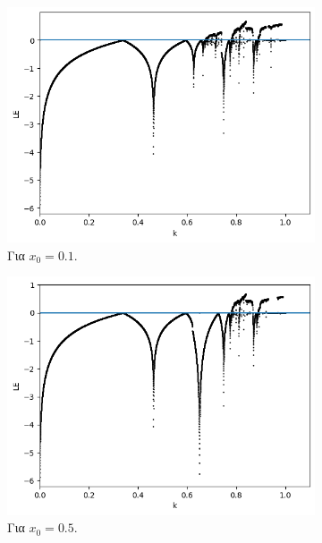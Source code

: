 \begin{figure}[h!]
	\centering
	\begin{subfigure}[b]{0.45\textwidth}
		\centering
		\includegraphics[width=\textwidth]{LateX images/graphs q16/g7}
		\caption{Για \(x_0=0.1\).}
		\label{f:g33}
	\end{subfigure}
	\hfill
	\begin{subfigure}[b]{0.45\textwidth}
		\centering
		\includegraphics[width=\textwidth]{LateX images/graphs q16/g8}
		\caption{Για \(x_0=0.5\).}
		\label{f:g34}
	\end{subfigure}
	\hfill
	\begin{subfigure}[b]{0.45\textwidth}
		\centering

\end{subfigure}
\end{figure}
